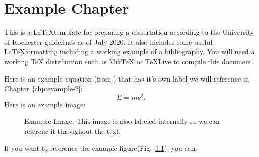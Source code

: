 \documentclass[\main/master.tex]{subfiles}
\begin{document}
\chapter{Example Chapter}\label{chp:example-1}
\hspace{5 mm} This is a \LaTeX template for preparing a dissertation according to the University of Rochester guidelines \cite{uofr_guidelines} as of July 2020. It also includes some useful \LaTeX formatting including a working example of a bibliography. You will need a working TeX distribution such as MikTeX \cite{miktex_home} or TeXLive \cite{texlive_nodate} to compile this document.  \par
Here is an example equation (from \cite{einstein1905tragheit}) that has it's own label we will reference in Chapter~\ref{chp:example-2}:
\begin{equation}
E=mc^{2}.\label{eqn:energy-mass-equivalence-relation}
\end{equation}
Here is an example image:
\begin{figure}[htbp]
	\centering
	\caption[Example Image]{Example Image. This image is also labeled internally so we can referenc it throughout the text.}
	\label{fig:sine-wave}
\end{figure}
If you want to reference the example figure(Fig.~\ref{fig:sine-wave}), you can.
\end{document}
